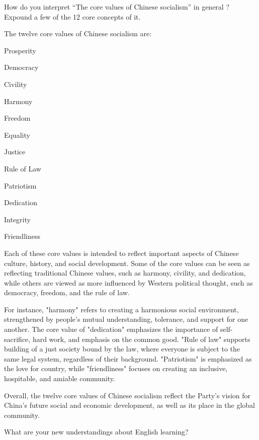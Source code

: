 \documentclass[lang=cn,10pt]{elegantbook}
\begin{document}
\begin{example}
	How do you interpret “The core values of Chinese socialism” in general ? Expound a few of the 12 core concepts of it.
\end{example}
\begin{solution}
	The twelve core values of Chinese socialism are:
	
	Prosperity
	
	Democracy
	
	Civility
	
	Harmony
	
	Freedom
	
	Equality
	
	Justice
	
	Rule of Law
	
	Patriotism
	
	Dedication
	
	Integrity
	
	Friendliness
	
	
	Each of these core values is intended to reflect important aspects of Chinese culture, history, and social development. Some of the core values can be seen as reflecting traditional Chinese values, such as harmony, civility, and dedication, while others are viewed as more influenced by Western political thought, such as democracy, freedom, and the rule of law.
	
	For instance, "harmony" refers to creating a harmonious social environment, strengthened by people's mutual understanding, tolerance, and support for one another. The core value of "dedication" emphasizes the importance of self-sacrifice, hard work, and emphasis on the common good. "Rule of law" supports building of a just society bound by the law, where everyone is subject to the same legal system, regardless of their background. "Patriotism" is emphasized as the love for country, while "friendliness" focuses on creating an inclusive, hospitable, and amiable community.
	
	Overall, the twelve core values of Chinese socialism reflect the Party's vision for China's future social and economic development, as well as its place in the global community.
\end{solution}
\begin{example}
	What are your new understandings about English learning?
\end{example}
\end{document}

